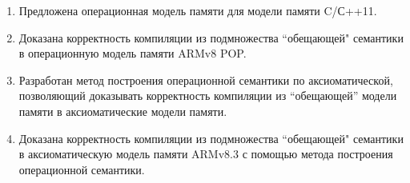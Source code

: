 {}
\begin{enumerate}
  \item Предложена операционная модель памяти для модели памяти C/С++11.
  \item Доказана корректность компиляции из подмножества ``обещающей" \; семантики в операционную модель памяти ARMv8 POP.
  \item Разработан метод построения операционной семантики по аксиоматической, позволяющий доказывать корректность
        компиляции из ``обещающей'' модели памяти в аксиоматические модели памяти.
  \item Доказана корректность компиляции из подмножества ``обещающей" \; семантики в аксиоматическую модель памяти ARMv8.3
  с помощью метода построения операционной семантики.
\end{enumerate}

